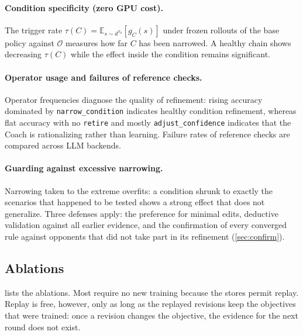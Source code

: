 \documentclass[11pt]{article}
\newcommand{\opp}{\mathcal{O}}           %
\newcommand{\E}{\mathbb{E}}
\newcommand{\code}[1]{\texttt{\small #1}}
\begin{document}
\paragraph{Condition specificity (zero GPU cost).}
The trigger rate $\tau(C) = \E_{s\sim d^{\pi_0}}[g_C(s)]$ under frozen rollouts of the base policy against $\opp$ measures how far $C$ has been narrowed.
A healthy chain shows decreasing $\tau(C)$ while the effect inside the condition remains significant.

\paragraph{Operator usage and failures of reference checks.}
Operator frequencies diagnose the quality of refinement: rising accuracy dominated by \code{narrow\_condition} indicates healthy condition refinement, whereas flat accuracy with no \code{retire} and mostly \code{adjust\_confidence} indicates that the Coach is rationalizing rather than learning.
Failure rates of reference checks are compared across LLM backends.

\paragraph{Guarding against excessive narrowing.}
Narrowing taken to the extreme overfits: a condition shrunk to exactly the scenarios that happened to be tested shows a strong effect that does not generalize.
Three defenses apply: the preference for minimal edits, deductive validation against all earlier evidence, and the confirmation of every converged rule against opponents that did not take part in its refinement (\cref{sec:confirm}).

\subsection{Ablations}
\label{sec:ablations}

 lists the ablations.
Most require no new training because the stores permit replay.
Replay is free, however, only as long as the replayed revisions keep the objectives that were trained: once a revision changes the objective, the evidence for the next round does not exist.
\end{document}
